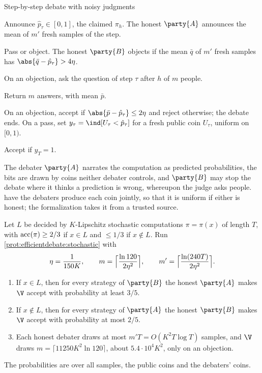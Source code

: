 \begin{refsection}
\begin{protocol}{Step-by-step debate with noisy judgments}\label{prot:efficientdebate:stochastic}
\item[\msg{A}{V}] Announce $\hat p_\tau\in[0,1]$, the claimed $\pi_h$. The honest $\party{A}$ announces the mean of $m'$ fresh samples of the step.
\item[\msg{B}{V}] Pass or object. The honest $\party{B}$ objects if the mean $\bar q$ of $m'$ fresh samples has $\abs{\bar q-\hat p_\tau}>4\eta$.
\item[\msg{V}{H}] On an objection, ask the question of step $\tau$ after $h$ of $m$ people.
\item[\msg{H}{V}] Return $m$ answers, with mean $\bar p$.
\item[\act{V}] On an objection, accept if $\abs{\bar p-\hat p_\tau}\le2\eta$ and reject otherwise; the debate ends. On a pass, set $y_\tau=\ind[U_\tau<\hat p_\tau]$ for a fresh public coin $U_\tau$, uniform on $[0,1)$.
\item[\act{V}] Accept if $y_T=1$.
\end{protocol}

The debater $\party{A}$ narrates the computation as predicted probabilities, the bits are drawn by coins neither debater controls, and $\party{B}$ may stop the debate where it thinks a prediction is wrong, whereupon the judge asks people. \Textcite{BrownCohenEtAl2024} have the debaters produce each coin jointly, so that it is uniform if either is honest; the formalization takes it from a trusted source.

\begin{theorem}\label{thm:efficientdebate:stochastic}
Let $L$ be decided by $K$-Lipschitz stochastic computations $\pi=\pi(x)$ of length $T$, with $\operatorname{acc}(\pi)\ge2/3$ if $x\in L$ and $\le1/3$ if $x\notin L$. Run \cref{prot:efficientdebate:stochastic} with
\[
\eta=\frac1{150K},\qquad m=\Bigl\lceil\frac{\ln120}{2\eta^2}\Bigr\rceil,\qquad m'=\Bigl\lceil\frac{\ln(240T)}{2\eta^2}\Bigr\rceil.
\]
\begin{enumerate}
\item If $x\in L$, then for every strategy of $\party{B}$ the honest $\party{A}$ makes $\V$ accept with probability at least $3/5$.
\item If $x\notin L$, then for every strategy of $\party{A}$ the honest $\party{B}$ makes $\V$ accept with probability at most $2/5$.
\item Each honest debater draws at most $m'T=O(K^2T\log T)$ samples, and $\V$ draws $m=\lceil11250K^2\ln120\rceil$, about $5.4\cdot10^4K^2$, only on an objection.
\end{enumerate}
The probabilities are over all samples, the public coins and the debaters' coins.
\end{theorem}


\end{refsection}
